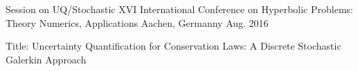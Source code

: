 \begin{cventries}
  \cventry
    {Session on UQ/Stochastic} %
    {XVI International Conference on Hyperbolic Problems: Theory Numerics,
      Applications} %
    {Aachen, Germanny} %
    {Aug. 2016} %
    {
      \begin{cvitems} %
        \item {Title: Uncertainty Quantification for Conservation Laws: A
          Discrete Stochastic Galerkin Approach}
      \end{cvitems}
    }

\end{cventries}
